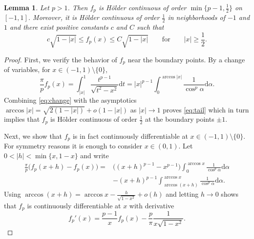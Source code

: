 \documentclass[a4paper,12pt,reqno]{amsart}
\newtheorem{lemma}[theorem]{Lemma}
\theoremstyle{definition}
\newcommand{\dd}{\mathrm{d}}
\begin{document}
\begin{lemma} \label{lem:hoelder}
	Let $p>1$. Then $f_p$ is Hölder continuous of order $\min\{p-1,\frac{1}{2}\}$ on $[-1,1]$. Moreover, it is Hölder continuous of order $\frac{1}{2}$ in neighborhoods of $-1$ and $1$ and there exist positive constants $c$ and $C$ such that 
\begin{equation} \label{eq:tail}
	c\sqrt{1-|x|}\le f_p(x) \le C\sqrt{1-|x|}\qquad \text{for}\qquad |x|\ge\frac{1}{2}.
\end{equation}
\end{lemma}
\begin{proof}
First, we verify the behavior of $f_p$ near the boundary points. By a change of variables, for $x\in (-1,1)\setminus\{0\}$, 
\begin{equation} \label{eq:change}
\frac{\pi}{p}f_p(x)
=\int_{|x|}^1 \frac{t^{p-1}}{\sqrt{t^2-x^2}}\dd t
=|x|^{p-1}\int_0^{\arccos |x|}\frac{1}{\cos^p \alpha}\dd \alpha.
\end{equation}
Combining \eqref{eq:change} with the asymptotics $\arccos |x|=\sqrt{2(1-|x|)}+o(1-|x|)$ as $|x|\to 1$ proves \eqref{eq:tail} which in turn implies that $f_p$ is Hölder continuous of order $\frac{1}{2}$ at the boundary points $\pm 1$.

Next, we show that $f_p$ is in fact continuously differentiable at $x\in (-1,1)\setminus \{0\}$. For symmetry reasons it is enough to consider $x\in (0,1)$. Let $0<|h|<\min\{x,1-x\}$ and write 
\begin{align*}
\frac{\pi}{p}\big(f_p(x+h)-f_p(x)\big)	
=&\big((x+h)^{p-1}-x^{p-1}\big)\int_0^{\arccos x}\frac{1}{\cos^p\alpha}\dd\alpha\\
&-(x+h)^{p-1}\int_{\arccos(x+h)}^{\arccos x}\frac{1}{\cos^p \alpha}\dd \alpha.
\end{align*}
Using $\arccos(x+h)=\arccos x -\frac{h}{\sqrt{1-x^2}}+o(h)$ and letting $h\to 0$ shows that $f_p$ is continuously differentiable at $x$ with derivative
\[
f_p'(x)
=\frac{p-1}{x}f_p(x)-\frac{p}{\pi}\frac{1}{x\sqrt{1-x^2}}.
\]


\end{proof}
\end{document}
